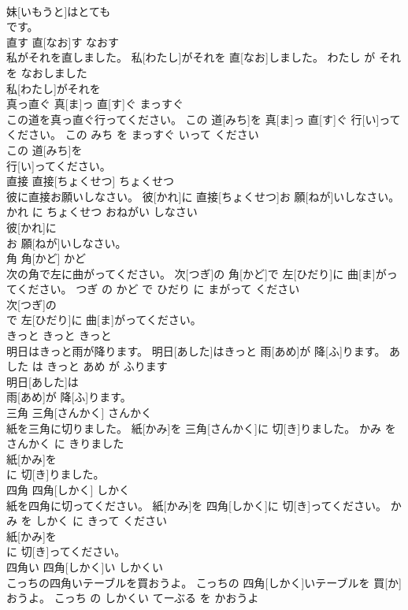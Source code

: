 \documentclass[8pt]{extreport}
\begin{document}
\begin{CJK}{UTF8}{min}
\\	妹[いもうと]はとても
\\	です。			
\\	直す	直[なお]す	なおす	
\\	私がそれを直しました。	私[わたし]がそれを 直[なお]しました。	わたし が それ を なおしました	
\\	私[わたし]がそれを
\\	真っ直ぐ	真[ま]っ 直[す]ぐ	まっすぐ	
\\	この道を真っ直ぐ行ってください。	この 道[みち]を 真[ま]っ 直[す]ぐ 行[い]ってください。	この みち を まっすぐ いって ください	
\\	この 道[みち]を
\\	行[い]ってください。			
\\	直接	直接[ちょくせつ]	ちょくせつ	
\\	彼に直接お願いしなさい。	彼[かれ]に 直接[ちょくせつ]お 願[ねが]いしなさい。	かれ に ちょくせつ おねがい しなさい	
\\	彼[かれ]に
\\	お 願[ねが]いしなさい。			
\\	角	角[かど]	かど	
\\	次の角で左に曲がってください。	次[つぎ]の 角[かど]で 左[ひだり]に 曲[ま]がってください。	つぎ の かど で ひだり に まがって ください	
\\	次[つぎ]の
\\	で 左[ひだり]に 曲[ま]がってください。			
\\	きっと	きっと	きっと	
\\	明日はきっと雨が降ります。	明日[あした]はきっと 雨[あめ]が 降[ふ]ります。	あした は きっと あめ が ふります	
\\	明日[あした]は
\\	雨[あめ]が 降[ふ]ります。			
\\	三角	三角[さんかく]	さんかく	
\\	紙を三角に切りました。	紙[かみ]を 三角[さんかく]に 切[き]りました。	かみ を さんかく に きりました	
\\	紙[かみ]を
\\	に 切[き]りました。			
\\	四角	四角[しかく]	しかく	
\\	紙を四角に切ってください。	紙[かみ]を 四角[しかく]に 切[き]ってください。	かみ を しかく に きって ください	
\\	紙[かみ]を
\\	に 切[き]ってください。			
\\	四角い	四角[しかく]い	しかくい	
\\	こっちの四角いテーブルを買おうよ。	こっちの 四角[しかく]いテーブルを 買[か]おうよ。	こっち の しかくい てーぶる を かおうよ	

\end{CJK}
\end{document}
